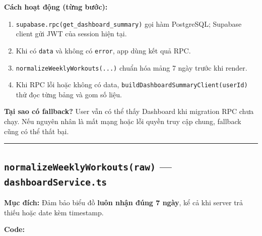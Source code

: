\documentclass[12pt,a4paper]{article}
\providecommand{\tightlist}{%
  \setlength{\itemsep}{0pt}\setlength{\parskip}{0pt}}
\begin{document}
\textbf{Cách hoạt động (từng bước):}

\begin{enumerate}
\def\labelenumi{\arabic{enumi}.}
\tightlist
\item
  \texttt{supabase.rpc(\textquotesingle{}get\_dashboard\_summary\textquotesingle{})}
  gọi hàm PostgreSQL; Supabase client gửi JWT của session hiện tại.
\item
  Khi có \texttt{data} và không có \texttt{error}, app dùng kết quả RPC.
\item
  \texttt{normalizeWeeklyWorkouts(...)} chuẩn hóa mảng 7 ngày trước khi
  render.
\item
  Khi RPC lỗi hoặc không có data,
  \texttt{buildDashboardSummaryClient(userId)} thử đọc từng bảng và gom
  số liệu.
\end{enumerate}

\textbf{Tại sao có fallback?} User vẫn có thể thấy Dashboard khi
migration RPC chưa chạy. Nếu nguyên nhân là mất mạng hoặc lỗi quyền truy
cập chung, fallback cũng có thể thất bại.

\begin{center}\rule{0.5\linewidth}{0.5pt}\end{center}

\subsection{\texorpdfstring{\texttt{normalizeWeeklyWorkouts(raw)} ---
\texttt{dashboardService.ts}}{normalizeWeeklyWorkouts(raw) --- dashboardService.ts}}\label{normalizeweeklyworkoutsraw-dashboardservice.ts}

\textbf{Mục đích:} Đảm bảo biểu đồ \textbf{luôn nhận đúng 7 ngày}, kể cả
khi server trả thiếu hoặc date kèm timestamp.

\textbf{Code:}
\end{document}
